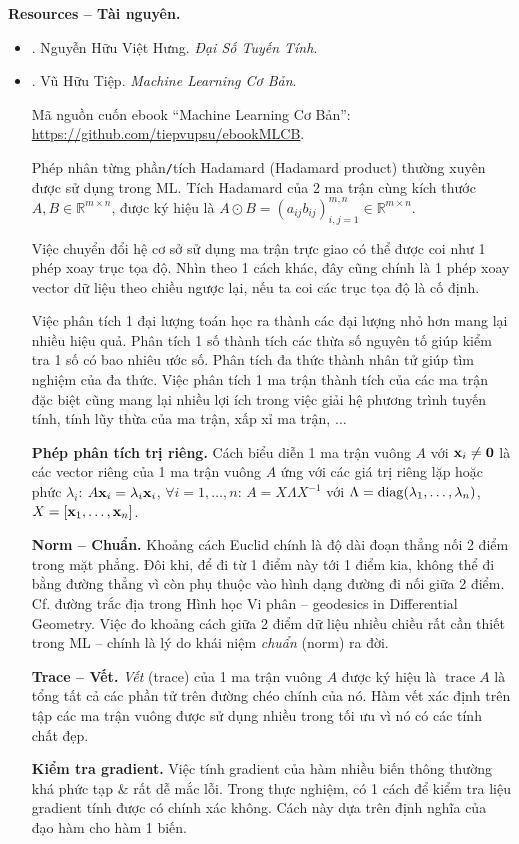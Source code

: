 \documentclass{article}
\begin{document}
\noindent\textbf{\textsf{Resources -- Tài nguyên.}}
\begin{itemize}
	\item \cite{Hung_linear_algebra}. {\sc Nguyễn Hữu Việt Hưng}. {\it Đại Số Tuyến Tính}.
	\item \cite{Tiep_ML_co_ban}. {\sc Vũ Hữu Tiệp}. {\it Machine Learning Cơ Bản}.
	
	Mã nguồn cuốn ebook ``Machine Learning Cơ Bản'': \url{https://github.com/tiepvupsu/ebookMLCB}.
	
	Phép nhân từng phần{\tt/}tích Hadamard (Hadamard product) thường xuyên được sử dụng trong ML. Tích Hadamard của 2 ma trận cùng kích thước $A,B\in\mathbb{R}^{m\times n}$, được ký hiệu là $A\odot B = (a_{ij}b_{ij})_{i,j=1}^{m,n}\in\mathbb{R}^{m\times n}$.
	
	Việc chuyển đổi hệ cơ sở sử dụng ma trận trực giao có thể được coi như 1 phép xoay trục tọa độ. Nhìn theo 1 cách khác, đây cũng chính là 1 phép xoay vector dữ liệu theo chiều ngược lại, nếu ta coi các trục tọa độ là cố định.
	
	Việc phân tích 1 đại lượng toán học ra thành các đại lượng nhỏ hơn mang lại nhiều hiệu quả. Phân tích 1 số thành tích các thừa số nguyên tố giúp kiểm tra 1 số có bao nhiêu ước số. Phân tích đa thức thành nhân tử giúp tìm nghiệm của đa thức. Việc phân tích 1 ma trận thành tích của các ma trận đặc biệt cũng mang lại nhiều lợi ích trong việc giải hệ phương trình tuyến tính, tính lũy thừa của ma trận, xấp xỉ ma trận, $\ldots$
	
	{\bf Phép phân tích trị riêng.} Cách biểu diễn 1 ma trận vuông $A$ với ${\bf x}_i\ne{\bf 0}$ là các vector riêng của 1 ma trận vuông $A$ ứng với các giá trị riêng lặp hoặc phức $\lambda_i$: $A{\bf x}_i = \lambda_i{\bf x}_i$, $\forall i = 1,\ldots,n$: $A = X\Lambda X^{-1}$ với $\Lambda = {\rm diag}(\lambda_1,\ldots,\lambda_n)$, $X = [{\bf x}_1,\ldots,{\bf x}_n]$.
	
	{\bf Norm -- Chuẩn.} Khoảng cách Euclid chính là độ dài đoạn thẳng nối 2 điểm trong mặt phẳng. Đôi khi, để đi từ 1 điểm này tới 1 điểm kia, không thể đi bằng đường thẳng vì còn phụ thuộc vào hình dạng đường đi nối giữa 2 điểm. Cf. đường trắc địa trong Hình học Vi phân -- geodesics in Differential Geometry. Việc đo khoảng cách giữa 2 điểm dữ liệu nhiều chiều rất cần thiết trong ML -- chính là lý do khái niệm {\it chuẩn} (norm) ra đời.
	
	{\bf Trace -- Vết.} {\it Vết} (trace) của 1 ma trận vuông $A$ được ký hiệu là $\operatorname{trace}A$ là tổng tất cả các phần tử trên đường chéo chính của nó. Hàm vết xác định trên tập các ma trận vuông được sử dụng nhiều trong tối ưu vì nó có các tính chất đẹp.
	
	{\bf Kiểm tra gradient.} Việc tính gradient của hàm nhiều biến thông thường khá phức tạp \& rất dễ mắc lỗi. Trong thực nghiệm, có 1 cách để kiểm tra liệu gradient tính được có chính xác không. Cách này dựa trên định nghĩa của đạo hàm cho hàm 1 biến.
\end{itemize}
\end{document}
